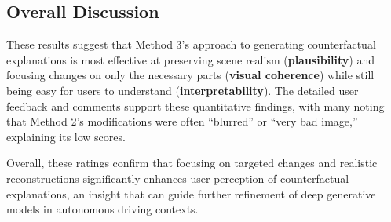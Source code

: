 \subsection{Overall Discussion}
These results suggest that Method 3’s approach to generating counterfactual explanations is most effective at preserving 
scene realism (\textbf{plausibility}) and focusing changes on only the necessary parts (\textbf{visual coherence}) while 
still being easy for users to understand (\textbf{interpretability}). The detailed user feedback and comments support 
these quantitative findings, with many noting that Method 2’s modifications were often “blurred” or “very bad image,” 
explaining its low scores.

Overall, these ratings confirm that focusing on targeted changes and realistic reconstructions significantly enhances 
user perception of counterfactual explanations, an insight that can guide further refinement of deep generative models 
in autonomous driving contexts.
